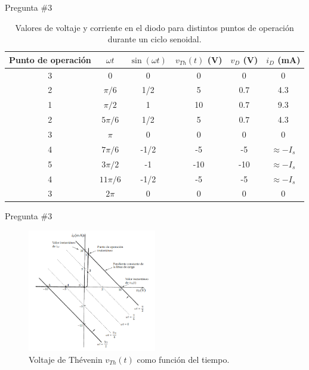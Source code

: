 \documentclass[
    10pt,
    aspectratio=169,
    xcolor={dvipsnames},
    spanish,
    ]{beamer}
\begin{document}
\begin{frame}{Pregunta \#3}
\begin{table}[H]
  \centering
  \begin{tabular}{c c c c c c}
    \hline
    Punto de operación & $\omega t$ & $\sin(\omega t)$ & $v_{Th}(t)$ (V) & $v_D$ (V) & $i_D$ (mA) \\
    \hline
    3 & 0 & 0 & 0 & 0 & 0 \\
    2 & $\pi/6$ & 1/2 & 5 & 0.7 & 4.3 \\
    1 & $\pi/2$ & 1 & 10 & 0.7 & 9.3 \\
    2 & $5\pi/6$ & 1/2 & 5 & 0.7 & 4.3 \\
    3 & $\pi$ & 0 & 0 & 0 & 0 \\
    4 & $7\pi/6$ & -1/2 & -5 & -5 & $\approx -I_s$ \\
    5 & $3\pi/2$ & -1 & -10 & -10 & $\approx -I_s$ \\
    4 & $11\pi/6$ & -1/2 & -5 & -5 & $\approx -I_s$ \\
    3 & $2\pi$ & 0 & 0 & 0 & 0 \\
    \hline
  \end{tabular}
  \caption{Valores de voltaje y corriente en el diodo para distintos puntos de operación durante un ciclo senoidal.}
  \label{tab:diodo-operacion}
\end{table}
\end{frame}
\begin{frame}{Pregunta \#3}
\begin{figure}[H]
    \centering
\includegraphics[width=0.5\textwidth]{Auxiliar_4_17}
    \caption{Voltaje de Thévenin $v_{Th}(t)$ como función del tiempo.}
    \label{fig:voltaje-th}
\end{figure}
  \end{frame}
\end{document}
